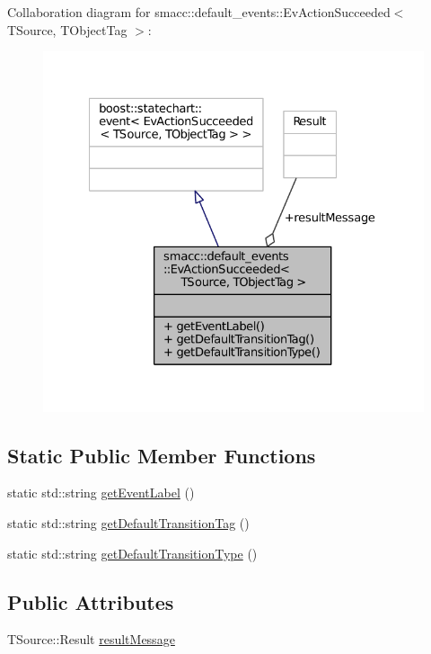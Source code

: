 Collaboration diagram for smacc\+:\+:default\+\_\+events\+:\+:Ev\+Action\+Succeeded$<$ T\+Source, T\+Object\+Tag $>$\+:
\nopagebreak
\begin{figure}[H]
\begin{center}
\leavevmode
\includegraphics[width=327pt]{structsmacc_1_1default__events_1_1EvActionSucceeded__coll__graph}
\end{center}
\end{figure}
\subsection*{Static Public Member Functions}
\begin{DoxyCompactItemize}
\item 
static std\+::string \hyperlink{structsmacc_1_1default__events_1_1EvActionSucceeded_a8d002ec0ef39a71d54469fe274ac8c2a}{get\+Event\+Label} ()
\item 
static std\+::string \hyperlink{structsmacc_1_1default__events_1_1EvActionSucceeded_aceba175d35d94315204cb075ad5d103e}{get\+Default\+Transition\+Tag} ()
\item 
static std\+::string \hyperlink{structsmacc_1_1default__events_1_1EvActionSucceeded_a2314ed322e122576381e35986249c68f}{get\+Default\+Transition\+Type} ()
\end{DoxyCompactItemize}
\subsection*{Public Attributes}
\begin{DoxyCompactItemize}
\item 
T\+Source\+::\+Result \hyperlink{structsmacc_1_1default__events_1_1EvActionSucceeded_a5178997ebcf9a7a738e0bda57bd658d1}{result\+Message}
\end{DoxyCompactItemize}



